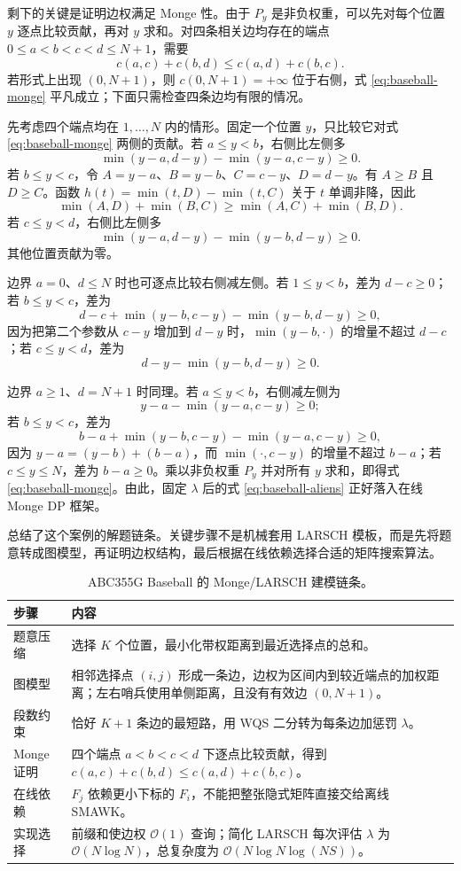 \documentclass[lang=cn,a4paper,newtx,code=minted,bibtex]{elegantpaper}
\newcommand{\BigO}{\mathcal{O}}
\begin{document}
剩下的关键是证明边权满足 Monge 性。由于 $P_y$ 是非负权重，可以先对每个位置 $y$ 逐点比较贡献，再对 $y$ 求和。对四条相关边均存在的端点 $0\le a<b<c<d\le N+1$，需要
\begin{equation}
  c(a,c)+c(b,d)\le c(a,d)+c(b,c).
  \label{eq:baseball-monge}
\end{equation}
若形式上出现 $(0,N+1)$，则 $c(0,N+1)=+\infty$ 位于右侧，式 \eqref{eq:baseball-monge} 平凡成立；下面只需检查四条边均有限的情况。

先考虑四个端点均在 $1,\ldots,N$ 内的情形。固定一个位置 $y$，只比较它对式 \eqref{eq:baseball-monge} 两侧的贡献。若 $a\le y<b$，右侧比左侧多
\[
  \min(y-a,d-y)-\min(y-a,c-y)\ge 0.
\]
若 $b\le y<c$，令 $A=y-a$、$B=y-b$、$C=c-y$、$D=d-y$。有 $A\ge B$ 且 $D\ge C$。函数 $h(t)=\min(t,D)-\min(t,C)$ 关于 $t$ 单调非降，因此
\[
  \min(A,D)+\min(B,C)\ge \min(A,C)+\min(B,D).
\]
若 $c\le y<d$，右侧比左侧多
\[
  \min(y-a,d-y)-\min(y-b,d-y)\ge 0.
\]
其他位置贡献为零。

边界 $a=0$、$d\le N$ 时也可逐点比较右侧减左侧。若 $1\le y<b$，差为 $d-c\ge0$；若 $b\le y<c$，差为
\[
  d-c+\min(y-b,c-y)-\min(y-b,d-y)\ge0,
\]
因为把第二个参数从 $c-y$ 增加到 $d-y$ 时，$\min(y-b,\cdot)$ 的增量不超过 $d-c$；若 $c\le y<d$，差为
\[
  d-y-\min(y-b,d-y)\ge0.
\]

边界 $a\ge1$、$d=N+1$ 时同理。若 $a\le y<b$，右侧减左侧为
\[
  y-a-\min(y-a,c-y)\ge0;
\]
若 $b\le y<c$，差为
\[
  b-a+\min(y-b,c-y)-\min(y-a,c-y)\ge0,
\]
因为 $y-a=(y-b)+(b-a)$，而 $\min(\cdot,c-y)$ 的增量不超过 $b-a$；若 $c\le y\le N$，差为 $b-a\ge0$。乘以非负权重 $P_y$ 并对所有 $y$ 求和，即得式 \eqref{eq:baseball-monge}。由此，固定 $\lambda$ 后的式 \eqref{eq:baseball-aliens} 正好落入在线 Monge DP 框架。

 总结了这个案例的解题链条。关键步骤不是机械套用 LARSCH 模板，而是先将题意转成图模型，再证明边权结构，最后根据在线依赖选择合适的矩阵搜索算法。

\begin{table}[htbp]
\centering
\caption{ABC355G Baseball 的 Monge/LARSCH 建模链条。}
\label{tab:abc355g-pipeline}
\begin{tabular}{p{}p{}}
\toprule
步骤 & 内容 \\
\midrule
题意压缩 & 选择 $K$ 个位置，最小化带权距离到最近选择点的总和。 \\
图模型 & 相邻选择点 $(i,j)$ 形成一条边，边权为区间内到较近端点的加权距离；左右哨兵使用单侧距离，且没有有效边 $(0,N+1)$。 \\
段数约束 & 恰好 $K+1$ 条边的最短路，用 WQS 二分转为每条边加惩罚 $\lambda$。 \\
Monge 证明 & 四个端点 $a<b<c<d$ 下逐点比较贡献，得到 $c(a,c)+c(b,d)\le c(a,d)+c(b,c)$。 \\
在线依赖 & $F_j$ 依赖更小下标的 $F_i$，不能把整张隐式矩阵直接交给离线 SMAWK。 \\
实现选择 & 前缀和使边权 $\BigO(1)$ 查询；简化 LARSCH 每次评估 $\lambda$ 为 $\BigO(N\log N)$，总复杂度为 $\BigO(N\log N\log(NS))$。 \\
\bottomrule
\end{tabular}
\end{table}
\end{document}
